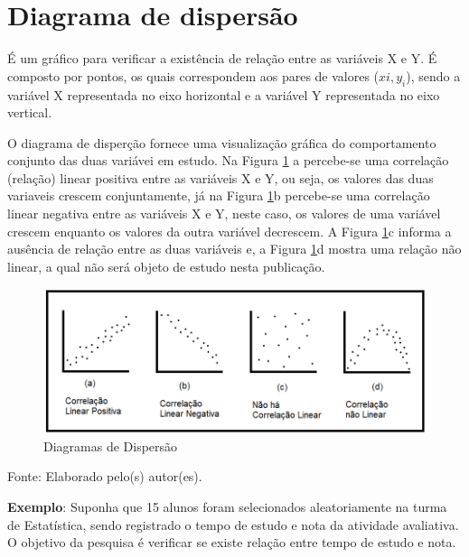 \documentclass[12pt,brazil,]{book}
\begin{document}
\hypertarget{diagrama-de-dispersao}{%
\section{Diagrama de dispersão}\label{diagrama-de-dispersao}}

É um gráfico para verificar a existência de relação entre as variáveis X
e Y. É composto por pontos, os quais correspondem aos pares de valores
(\(xi, y_i\)), sendo a variável X representada no eixo horizontal e a
variável Y representada no eixo vertical.

O diagrama de disperção fornece uma visualização gráfica do
comportamento conjunto das duas variávei em estudo. Na Figura
\ref{fig:diag} a percebe-se uma correlação (relação) linear positiva
entre as variáveis X e Y, ou seja, os valores das duas variaveis crescem
conjuntamente, já na Figura \ref{fig:diag}b percebe-se uma correlação
linear negativa entre as variáveis X e Y, neste caso, os valores de uma
variável crescem enquanto os valores da outra variável decrescem. A
Figura \ref{fig:diag}c informa a ausência de relação entre as duas
variáveis e, a Figura \ref{fig:diag}d mostra uma relação não linear, a
qual não será objeto de estudo nesta publicação.

\begin{figure}

{\centering \includegraphics[width=0.6\linewidth]{correlacao1} 

}

\caption{Diagramas de Dispersão}\label{fig:diag}
\end{figure}

Fonte: Elaborado pelo(s) autor(es).

\textbf{Exemplo}: Suponha que 15 alunos foram selecionados
aleatoriamente na turma de Estatística, sendo registrado o tempo de
estudo e nota da atividade avaliativa. O objetivo da pesquisa é
verificar se existe relação entre tempo de estudo e nota.
\end{document}

